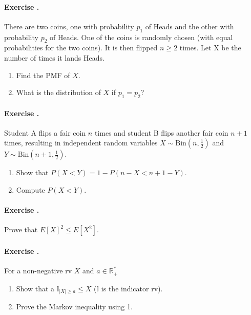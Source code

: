 \documentclass[twocolumn,12pt,a4paper]{article}
\newcommand{\R}{\mathbb R}
\newcounter{num}  %
\begin{document}
	\paragraph{Exercise \thenum.}
	There are two coins, one with probability $p_1$ of Heads and the other with probability $p_2$ of Heads. 
	One of the coins is randomly chosen (with equal probabilities for the two coins). 
	It is then flipped $n \geq 2$ times. 
	Let X be the number of times it lands Heads.
	\begin{enumerate}
		\item Find the PMF of $X$.
		\item What is the distribution of $X$ if $p_1 = p_2$?
		\end{enumerate}
	
	
	
	\paragraph{Exercise \thenum.}
	Student A flips a fair coin \(n\) times and student B flips another fair coin \(n+1\) times, resulting in independent random variables \( X \sim \text{Bin}(n, \frac{1}{2}) \) and \( Y \sim \text{Bin}(n+1, \frac{1}{2}) \).
	
	
	\begin{enumerate}
		\item Show that \( P(X < Y) = 1- P(n - X < n + 1 - Y) \).
	
	\item Compute \( P(X < Y) \).
	\end{enumerate}
	
	
	
	\paragraph{Exercise \thenum.}
	Prove that $E[X]^2\leq E[X^2]$. %
	
	
	\paragraph{Exercise \thenum.}
	For a non-negative rv $X$ and $a\in\R_+^*$ 
	\begin{enumerate}
		\item Show that a $\mathbb I _{|X|\geq a} \leq X$ ($\mathbb I $ is the indicator rv).
		\item Prove the Markov inequality using 1.
	\end{enumerate}
	
\end{document}
